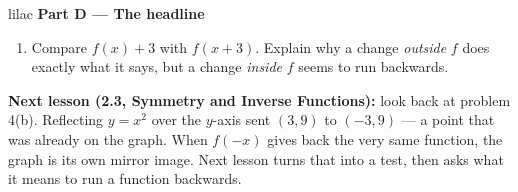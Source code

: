 \documentclass[10pt]{article}
\begin{document}
\vspace{0.06in}

\begin{headlinebox}{lilac}
\textbf{\color{plum}Part D --- The headline}
\end{headlinebox}

\begin{enumerate}[leftmargin=1.9em, itemsep=10pt, start=10]

\item Compare $f(x) + 3$ with $f(x + 3)$. Explain why a change \emph{outside} $f$ does exactly
      what it says, but a change \emph{inside} $f$ seems to run backwards.

\end{enumerate}

\vspace{0.1in}

\boxguard[8]
\begin{spiralbox}
\small
\textbf{Next lesson (2.3, Symmetry and Inverse Functions):} look back at problem 4(b).
Reflecting $y = x^2$ over the $y$-axis sent $(3, 9)$ to $(-3, 9)$ --- a point that was already
on the graph. When $f(-x)$ gives back the very same function, the graph is its own mirror
image. Next lesson turns that into a test, then asks what it means to run a function backwards.
\end{spiralbox}
\end{document}
